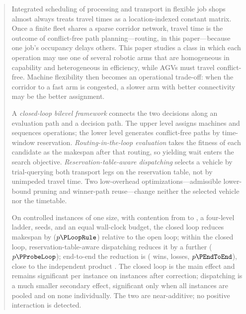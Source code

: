 \begin{abstract}
Integrated scheduling of processing and transport in flexible job shops almost always treats travel times as a location-indexed constant matrix.
Once a finite fleet shares a sparse corridor network, travel time is the outcome of conflict-free path planning---routing, in this paper---because one job's occupancy delays others.
This paper studies a class in which each operation may use one of several robotic arms that are homogeneous in capability and heterogeneous in efficiency, while AGVs must travel conflict-free.
Machine flexibility then becomes an operational trade-off: when the corridor to a fast arm is congested, a slower arm with better connectivity may be the better assignment.

A \emph{closed-loop bilevel framework} connects the two decisions along an evaluation path and a decision path.
The upper level assigns machines and sequences operations; the lower level generates conflict-free paths by time-window reservation.
\emph{Routing-in-the-loop evaluation} takes the fitness of each candidate as the makespan after that routing, so yielding wait enters the search objective.
\emph{Reservation-table-aware dispatching} selects a vehicle by trial-querying both transport legs on the reservation table, not by unimpeded travel time.
Two low-overhead optimizations---admissible lower-bound pruning and winner-path reuse---change neither the selected vehicle nor the timetable.

On \NCases{} controlled instances of one size, with contention from \ContentionLo{} to \ContentionHi{}, a four-level ladder, \NSeeds{} seeds, and an equal wall-clock budget, the closed loop reduces makespan by \GainLoopRule{} ($p\PLoopRule$) relative to the open loop;
within the closed loop, reservation-table-aware dispatching reduces it by a further \GainProbeLoop{} ($p\PProbeLoop$);
end-to-end the reduction is \GainEndToEnd{} (\WinEndToEnd{} wins, \LoseEndToEnd{} losses, $p\PEndToEnd$), close to the independent product \GainIndepProduct{}.
The closed loop is the main effect and remains significant per instance on \CellsSigLoopAdj{} instances after correction; dispatching is a much smaller secondary effect, significant only when all instances are pooled and on none individually.
The two are near-additive; no positive interaction is detected.
\end{abstract}

%

